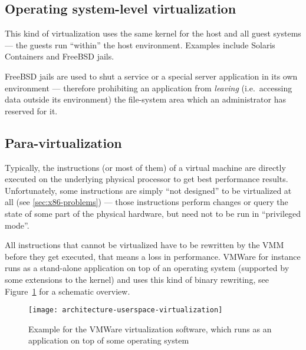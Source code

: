 \subsection{Operating system-level  virtualization}
\label{sec:oper-syst-level}

This kind  of virtualization  uses the  same kernel for  the host  and all
guest  systems  ---  the  guests  run  ``within''  the  host  environment.
Examples include Solaris Containers and FreeBSD jails.

FreeBSD jails are  used to shut a service or  a special server application
in  its own  environment  --- therefore  prohibiting  an application  from
\emph{leaving}   (i.e.~accessing  data   outside   its  environment)   the
file-system area which an administrator has reserved for it.

\subsection{Para-virtualization}
\label{sec:paravirtualization}

Typically, the  instructions (or  most of them)  of a virtual  machine are
directly  executed  on  the  underlying  physical processor  to  get  best
performance  results.  Unfortunately, some  instructions are  simply ``not
designed'' to be virtualized at all (see \ref{sec:x86-problems}) --- those
instructions  perform changes  or  query the  state  of some  part of  the
physical hardware, but need not to be run in ``privileged mode''.

All instructions that  cannot be virtualized have to  be rewritten by the
VMM before  they get executed, that  means a loss  in performance.  VMWare
\cite{vmware} for instance runs as  a stand-alone application on top of an
operating system  (supported by  some extensions to  the kernel)  and uses
this kind of  binary rewriting, see Figure~\ref{fig:arch-userspace-virt} for
a schematic overview.

\begin{figure}[htbp]
  \begin{center}
    \begin{minipage}{0.75\textwidth}
      \begin{center}
        \texttt{[image: architecture-userspace-virtualization]}
      \end{center}
      \caption[Virtualization  in  the   user-space]{Example  for  the  VMWare
        virtualization software, which  runs as an application on  top of some
        operating system}
      \label{fig:arch-userspace-virt}
    \end{minipage}
  \end{center}
\end{figure}

